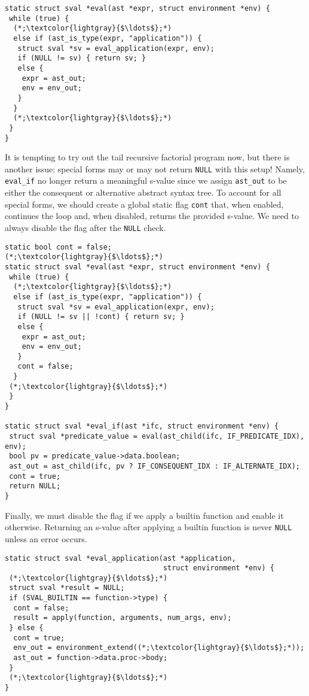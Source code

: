 \begin{cl}[eval.c]{}\begin{lstlisting}[language=MyC]
static struct sval *eval(ast *expr, struct environment *env) {
 while (true) {
  (*;\textcolor{lightgray}{$\ldots$};*)
  else if (ast_is_type(expr, "application")) {
   struct sval *sv = eval_application(expr, env);
   if (NULL != sv) { return sv; } 
   else {
    expr = ast_out;
    env = env_out;
   }
  } 
  (*;\textcolor{lightgray}{$\ldots$};*)
 }
}
\end{lstlisting}\end{cl}

It is tempting to try out the tail recursive factorial program now, but there is another issue: special forms may or may not return \texttt{NULL} with this setup! Namely, \texttt{eval\_if} no longer return a meaningful s-value since we assign \texttt{ast\_out} to be either the consequent or alternative abstract syntax tree. To account for all special forms, we should create a global static flag \texttt{cont} that, when enabled, continues the loop and, when disabled, returns the provided s-value. We need to always disable the flag after the \texttt{NULL} check. 

\begin{cl}[eval.c]{}\begin{lstlisting}[language=MyC]
static bool cont = false;
(*;\textcolor{lightgray}{$\ldots$};*)
static struct sval *eval(ast *expr, struct environment *env) {
 while (true) {
  (*;\textcolor{lightgray}{$\ldots$};*)
  else if (ast_is_type(expr, "application")) {
   struct sval *sv = eval_application(expr, env);
   if (NULL != sv || !cont) { return sv; } 
   else {
    expr = ast_out;
    env = env_out;
   }
   cont = false;
  } 
 (*;\textcolor{lightgray}{$\ldots$};*)
 }
}

static struct sval *eval_if(ast *ifc, struct environment *env) {
 struct sval *predicate_value = eval(ast_child(ifc, IF_PREDICATE_IDX), env);
 bool pv = predicate_value->data.boolean;
 ast_out = ast_child(ifc, pv ? IF_CONSEQUENT_IDX : IF_ALTERNATE_IDX);
 cont = true;
 return NULL;
}
\end{lstlisting}\end{cl}

Finally, we must disable the flag if we apply a builtin function and enable it otherwise. Returning an s-value after applying a builtin function is never \texttt{NULL} unless an error occurs.

\begin{cl}[eval.c]{}\begin{lstlisting}[language=MyC]
static struct sval *eval_application(ast *application, 
                                     struct environment *env) {
 (*;\textcolor{lightgray}{$\ldots$};*)
 struct sval *result = NULL;
 if (SVAL_BUILTIN == function->type) {
  cont = false;
  result = apply(function, arguments, num_args, env);
 } else {
  cont = true;
  env_out = environment_extend((*;\textcolor{lightgray}{$\ldots$};*));
  ast_out = function->data.proc->body;
 }
 (*;\textcolor{lightgray}{$\ldots$};*)
}
\end{lstlisting}\end{cl}

